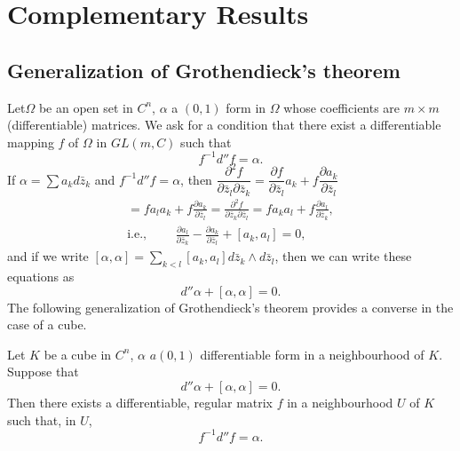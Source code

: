 \chapter{Complementary Results}\label{chap10}

\section{Generalization of Grothendieck's theorem}\label{chap10:sec1}

Let\pageoriginale $\Omega$ be an open set in $C^n$, $\alpha $ a $(0,1)$ form in
$\Omega$ whose coefficients are $m \times m$ (differentiable)
matrices. We ask for a condition that there exist a differentiable
mapping $f$ of $\Omega$ in $GL (m,C)$ such that
$$
f^{-1} d'' f = \alpha. 
$$
If $\alpha = \sum a_k d \bar{z}_k$ and $f^{-1} d'' f = \alpha$, then
$\dfrac{\partial^2 f}{\partial \bar{z}_l \partial \bar{z}_k} =
\dfrac{\partial f}{\partial \bar{z}_l} a_k + f\dfrac{\partial
  a_k}{\partial \bar{z}_l}$ 
\begin{gather*}
= f a_l a_k + f \frac{\partial a_k}{\partial \bar{z}_l} =
\frac{\partial^2 f}{\partial \bar{z}_k \partial \bar{z}_l} = f a_k
a_l + f \frac{\partial a_l}{\partial \bar{z}_k}, \\
\text{i.e., } \qquad \frac{\partial a_l}{\partial \bar{z}_k} -
\frac{\partial a_k}{\partial \bar{z}_l} + [a_k, a_l] = 0, \qquad 
\end{gather*}
and if we write $[\alpha, \alpha] = \sum\limits_{k <l } [a_k, a_l] d
\bar{z}_k \wedge d \bar{z}_l$, then we can write these equations as 
$$
d'' \alpha + [\alpha, \alpha] = 0.
$$
The following generalization of Grothendieck's theorem provides a
converse in the case of a cube. 

\setcounter{thm}{0}
\begin{thm}\label{chap10:thm1}
Let $K$ be a cube in $C^n$, $\alpha$ $a (0,1)$ differentiable form in a
neighbourhood of $K$. Suppose that 
$$
d'' \alpha + [\alpha, \alpha] = 0.
$$
Then there exists a differentiable, regular matrix $f$ in a
neighbourhood $U$ of $K$ such that, in $U$, 
$$
f^{-1 }d'' f =\alpha. 
$$
\end{thm}

